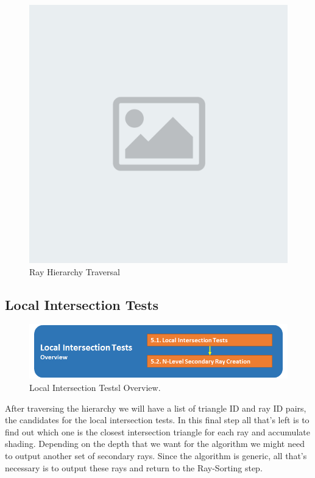 \documentclass{llncs}
\begin{document}
\begin{figure}
\centering
\includegraphics[scale=0.070]{images/placeholder.png}
\caption{Ray Hierarchy Traversal}
\end{figure}

%
\subsection{Local Intersection Tests}
%

\begin{figure}
\centering
\includegraphics[scale=0.60]{images/figure 6.png}
\caption{Local Intersection Testsl Overview.}
\end{figure}

After traversing the hierarchy we will have a list of triangle ID and ray ID pairs, the candidates for the local intersection tests. In this final step all that's left is to find out which one is the closest intersection triangle for each ray and accumulate shading. Depending on the depth that we want for the algorithm we might need to output another set of secondary rays. Since the algorithm is generic, all that's necessary is to output these rays and return to the Ray-Sorting step.
\end{document}
